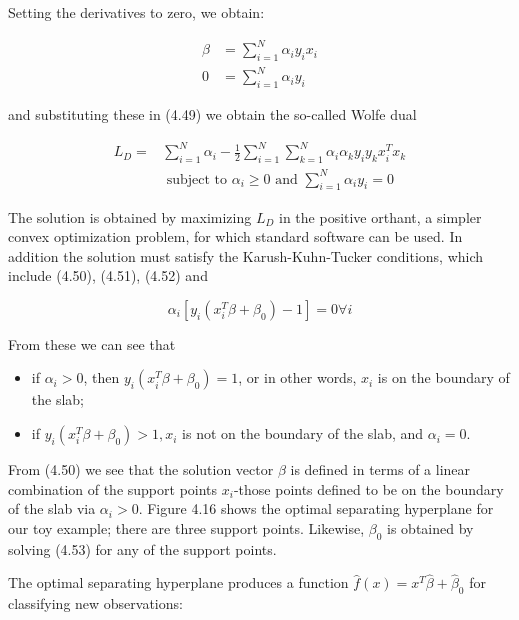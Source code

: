 \documentclass[10pt]{article}
\begin{document}
Setting the derivatives to zero, we obtain:


\begin{align*}
\beta & =\sum_{i=1}^{N} \alpha_{i} y_{i} x_{i}  \tag{4.50}\\
0 & =\sum_{i=1}^{N} \alpha_{i} y_{i} \tag{4.51}
\end{align*}


and substituting these in (4.49) we obtain the so-called Wolfe dual


\begin{align*}
L_{D}= & \sum_{i=1}^{N} \alpha_{i}-\frac{1}{2} \sum_{i=1}^{N} \sum_{k=1}^{N} \alpha_{i} \alpha_{k} y_{i} y_{k} x_{i}^{T} x_{k} \\
& \text { subject to } \alpha_{i} \geq 0 \text { and } \sum_{i=1}^{N} \alpha_{i} y_{i}=0 \tag{4.52}
\end{align*}


The solution is obtained by maximizing $L_{D}$ in the positive orthant, a simpler convex optimization problem, for which standard software can be used. In addition the solution must satisfy the Karush-Kuhn-Tucker conditions, which include (4.50), (4.51), (4.52) and


\begin{equation*}
\alpha_{i}\left[y_{i}\left(x_{i}^{T} \beta+\beta_{0}\right)-1\right]=0 \forall i \tag{4.53}
\end{equation*}


From these we can see that

\begin{itemize}
  \item if $\alpha_{i}>0$, then $y_{i}\left(x_{i}^{T} \beta+\beta_{0}\right)=1$, or in other words, $x_{i}$ is on the boundary of the slab;
  \item if $y_{i}\left(x_{i}^{T} \beta+\beta_{0}\right)>1, x_{i}$ is not on the boundary of the slab, and $\alpha_{i}=0$.
\end{itemize}

From (4.50) we see that the solution vector $\beta$ is defined in terms of a linear combination of the support points $x_{i}$-those points defined to be on the boundary of the slab via $\alpha_{i}>0$. Figure 4.16 shows the optimal separating hyperplane for our toy example; there are three support points. Likewise, $\beta_{0}$ is obtained by solving (4.53) for any of the support points.

The optimal separating hyperplane produces a function $\hat{f}(x)=x^{T} \hat{\beta}+\hat{\beta}_{0}$ for classifying new observations:
\end{document}
